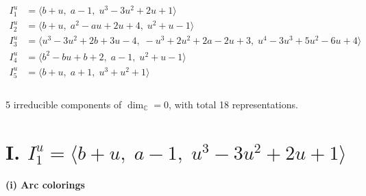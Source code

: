 \documentclass[1p]{elsarticle_modified}
\theoremstyle{definition}
\begin{document}
\begin{align*}
I^u_{1}&=\langle 
b+u,\;a-1,\;u^3-3 u^2+2 u+1\rangle \\
I^u_{2}&=\langle 
b+u,\;a^2- a u+2 u+4,\;u^2+u-1\rangle \\
I^u_{3}&=\langle 
u^3-3 u^2+2 b+3 u-4,\;- u^3+2 u^2+2 a-2 u+3,\;u^4-3 u^3+5 u^2-6 u+4\rangle \\
I^u_{4}&=\langle 
b^2- b u+b+2,\;a-1,\;u^2+u-1\rangle \\
I^u_{5}&=\langle 
b+u,\;a+1,\;u^3+u^2+1\rangle \\
\\
\end{align*}
\raggedright * 5 irreducible components of $\dim_{\mathbb{C}}=0$, with total 18 representations.\\
\newpage
\renewcommand{\arraystretch}{1}
\centering \section*{I. $I^u_{1}= \langle b+u,\;a-1,\;u^3-3 u^2+2 u+1 \rangle$}
\flushleft \textbf{(i) Arc colorings}\\
\end{document}
